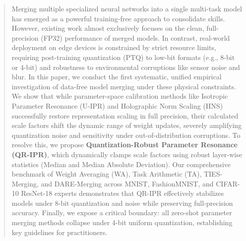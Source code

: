 \documentclass{article}
\theoremstyle{plain}
\theoremstyle{definition}
\theoremstyle{remark}
\begin{document}

\printAffiliationsAndNotice{}

\begin{abstract}
Merging multiple specialized neural networks into a single multi-task model has emerged as a powerful training-free approach to consolidate skills. However, existing work almost exclusively focuses on the clean, full-precision (FP32) performance of merged models. In contrast, real-world deployment on edge devices is constrained by strict resource limits, requiring post-training quantization (PTQ) to low-bit formats (e.g., 8-bit or 4-bit) and robustness to environmental corruptions like sensor noise and blur. In this paper, we conduct the first systematic, unified empirical investigation of data-free model merging under these physical constraints. We show that while parameter-space calibration methods like Isotropic Parameter Resonance (U-IPR) and Holographic Norm Scaling (HNS) successfully restore representation scaling in full precision, their calculated scale factors shift the dynamic range of weight updates, severely amplifying quantization noise and sensitivity under out-of-distribution corruptions. To resolve this, we propose \textbf{Quantization-Robust Parameter Resonance (QR-IPR)}, which dynamically clamps scale factors using robust layer-wise statistics (Median and Median Absolute Deviation). Our comprehensive benchmark of Weight Averaging (WA), Task Arithmetic (TA), TIES-Merging, and DARE-Merging across MNIST, FashionMNIST, and CIFAR-10 ResNet-18 experts demonstrates that QR-IPR effectively stabilizes models under 8-bit quantization and noise while preserving full-precision accuracy. Finally, we expose a critical boundary: all zero-shot parameter merging methods collapse under 4-bit uniform quantization, establishing key guidelines for practitioners.
\end{abstract}
\end{document}
